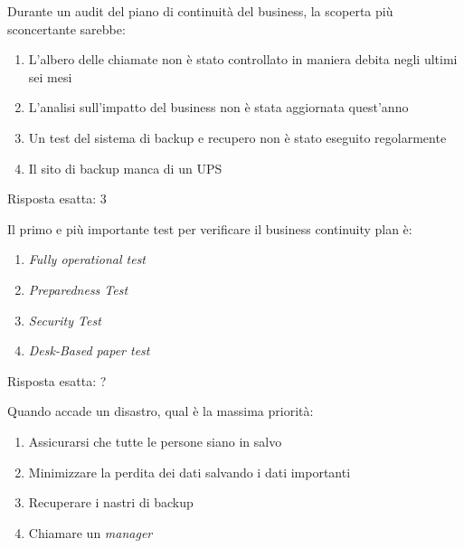 \begin{Exercise} [
  title={Domanda su BCP},
  label={bcdr5}
 ]
 
 \Question Durante un audit del piano di continuità del business, la scoperta 
 più sconcertante sarebbe:
 \begin{enumerate}
   \item L'albero delle chiamate non è stato controllato in maniera debita 
   negli ultimi sei mesi
   \item L'analisi sull'impatto del business non è stata aggiornata quest'anno
   \item Un test del sistema di backup e recupero non è stato eseguito 
   regolarmente
   \item Il sito di backup manca di un UPS
 \end{enumerate}
  
\end{Exercise}

\begin{Answer} [
  ref={bcdr5},
  number={5}
 ]
 
 \Question Risposta esatta: 3
 
\end{Answer}


\begin{Exercise} [
  title={},
  label={bcdr6}
 ]
 
 \Question Il primo e più importante test per verificare il business
 continuity plan è:
 \begin{enumerate}
   \item \textit{Fully operational test}
   \item \textit{Preparedness Test}
   \item \textit{Security Test}
   \item \textit{Desk-Based paper test}
 \end{enumerate}
  
\end{Exercise}

\begin{Answer} [
  ref={bcdr6},
  number={6}
 ]
 
 \Question Risposta esatta: ?

\end{Answer}


\begin{Exercise} [
  title={},
  label={bcdr7}
 ]
 
 \Question Quando accade un disastro, qual è la massima priorità:
 \begin{enumerate}
   \item Assicurarsi che tutte le persone siano in salvo
   \item Minimizzare la perdita dei dati salvando i dati importanti
   \item Recuperare i nastri di backup
   \item Chiamare un \textit{manager}
 \end{enumerate}
  
\end{Exercise}

